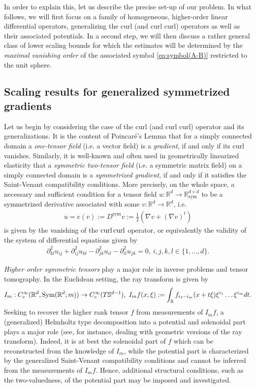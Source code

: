 \documentclass[a4paper, 10pt, twoside, notitlepage]{amsart}
\theoremstyle{plain}
\newcommand{\R}{\mathbb{R}}
\newcommand{\p}{\partial}
\renewcommand{\S}[1]{\textup{Sym}(\R^d;#1)}
\newcommand{\Ds}{D^{\text{sym}}}
\begin{document}
	In order to explain this, let us describe the precise set-up of our problem.  In what follows, we will first focus on a family of homogeneous, higher-order linear differential operators,
	generalizing the curl (and curl curl) operators as well as their associated potentials. 
	In a second step, we will then discuss a rather general class of lower scaling bounds for which the estimates will be determined by the \emph{maximal vanishing order} of the associated symbol \eqref{eq:symbol(A-B)} restricted to the unit sphere.
	
	
	\subsection{Scaling results for generalized symmetrized gradients}		
	Let us begin by considering the case of the curl (and curl curl) operator and its generalizations. It is the content of Poincar\'e's Lemma that for a simply connected domain a \emph{one-tensor
		field} (i.e. a vector field) is a \emph{gradient}, if and only if its curl vanishes. Similarly, it is well-known and often used in geometrically linearized elasticity that a \emph{symmetric two-tensor
		field} (i.e. a symmetric matrix field) on a simply connected domain is a \emph{symmetrized gradient}, if and only if it satisfies the Saint-Venant compatibility conditions. More precisely, on the
	whole space, a necessary and sufficient condition for a tensor field $u: \R^{d} \to \R^{d \times d}_{\text{sym}}$ to be a symmetrized derivative associated with some $v: \R^d \to \R^d$, i.e.
	\begin{align*}
		u=e(v):= \Ds v := \frac{1}{2}(\nabla v + (\nabla v)^t)
	\end{align*}
	is given by the vanishing of the $\operatorname{curl} \operatorname{curl}$ operator, or equivalently the validity of the system of differential equations given by
	\begin{align*}
		\p_{kl}^2 u_{ij} + \p_{ij}^2 u_{kl} - \p_{jk}^2 u_{il} - \p_{il}^2 u_{jk} = 0, \ i,j,k,l \in \{1,\dots,d\}.
	\end{align*}
	
	\emph{Higher order symmetric tensors} play a major role in inverse problems and tensor tomography. In the Euclidean setting, the ray transform is given by
	\begin{align*}
	I_m: C_c^{\infty}(\R^d, \S{m}) \rightarrow C_c^{\infty}(T \mathbb{S}^{d-1}),\
	I_m f(x,\xi):=\int_{\R}  f_{i_1\dotsi i_m}(x + t \xi) \xi^{i_1}\dots \xi^{i_m}  dt.
	\end{align*}
	Seeking to recover the higher rank tensor $f$ from measurements of $I_m f$, a (generalized) Helmholtz type decomposition into a potential and solenoidal part plays a major role (see, for instance, \cite{PSU14,IM19,PSU23, Sha94} dealing with geometric versions of the ray transform). Indeed, it is at best the solenoidal part of $f$ which can be reconstructed from the knowledge of $I_m$, while the potential part is characterized by the generalized Saint-Venant compatibility conditions and cannot be inferred from the measurements of $I_m f$. Hence, additional structural conditions, such as the two-valuedness, of the potential part may be imposed and investigated.
	
\end{document}
